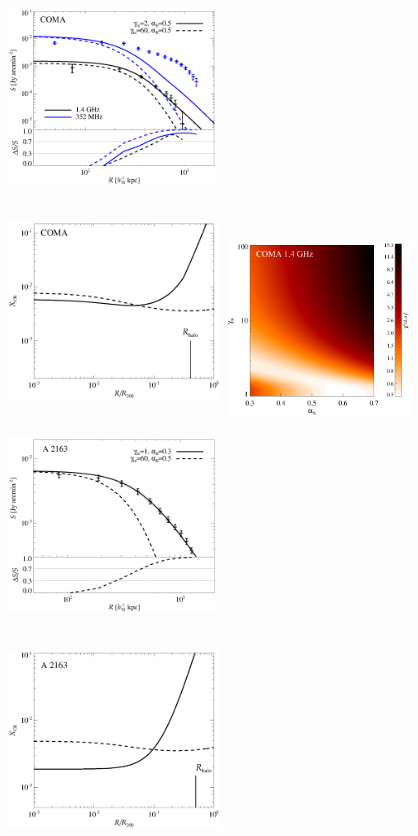 \documentclass[useAMS,usenatbib]{mn2e}
\begin{document}
\begin{figure}
\centering
%
\includegraphics[width=5.5cm,height=5.5cm,keepaspectratio]{figures/SB_Coma.eps}
\includegraphics[width=5.6cm,height=5.6cm,keepaspectratio]{figures/XCR_Coma.eps}
\includegraphics[width=5cm,height=4.6cm]{figures/ProbComa.eps}
\includegraphics[width=5.5cm,height=5.5cm,keepaspectratio]{figures/SB_A2163.eps}
\includegraphics[width=5.6cm,height=5.6cm,keepaspectratio]{figures/XCR_A2163.eps}

\end{figure}
\end{document}
